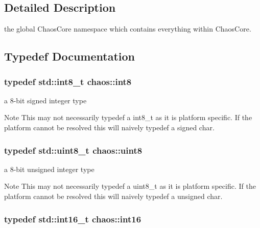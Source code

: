 \subsection{Detailed Description}
the global Chaos\+Core namespace which contains everything within Chaos\+Core. 

\subsection{Typedef Documentation}
\hypertarget{namespacechaos_a557c5c30e5a935845432e60c617bd688}{}
\subsubsection[{int8}]{\setlength{\rightskip}{0pt plus 5cm}typedef std\+::int8\+\_\+t {\bf chaos\+::int8}}\label{namespacechaos_a557c5c30e5a935845432e60c617bd688}


a 8-\/bit signed integer type 

\begin{DoxyNote}{Note}
This may not necessarily {\ttfamily typedef} a {\ttfamily int8\+\_\+t} as it is platform specific. If the platform cannot be resolved this will naively {\ttfamily typedef} a {\ttfamily signed char}. 
\end{DoxyNote}
\hypertarget{namespacechaos_acbc0796d6929e3182cfd4f5c0176ab51}{}
\subsubsection[{uint8}]{\setlength{\rightskip}{0pt plus 5cm}typedef std\+::uint8\+\_\+t {\bf chaos\+::uint8}}\label{namespacechaos_acbc0796d6929e3182cfd4f5c0176ab51}


a 8-\/bit unsigned integer type 

\begin{DoxyNote}{Note}
This may not necessarily {\ttfamily typedef} a {\ttfamily uint8\+\_\+t} as it is platform specific. If the platform cannot be resolved this will naively {\ttfamily typedef} a {\ttfamily unsigned char}. 
\end{DoxyNote}
\hypertarget{namespacechaos_a5dd2297d965311a05d313aaba7752f55}{}
\subsubsection[{int16}]{\setlength{\rightskip}{0pt plus 5cm}typedef std\+::int16\+\_\+t {\bf chaos\+::int16}}\label{namespacechaos_a5dd2297d965311a05d313aaba7752f55}


